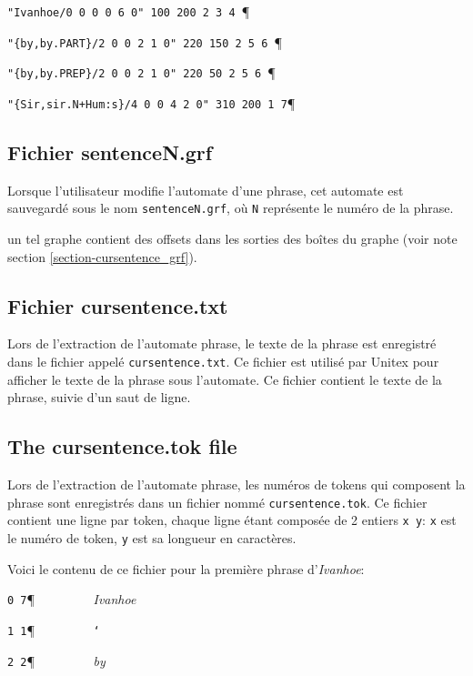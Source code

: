 \bigskip
\noindent \verb$"Ivanhoe/0 0 0 0 6 0" 100 200 2 3 4 $\P
 
\noindent \verb$"{by,by.PART}/2 0 0 2 1 0" 220 150 2 5 6 $\P

\noindent \verb$"{by,by.PREP}/2 0 0 2 1 0" 220 50 2 5 6 $\P

\noindent \verb$"{Sir,sir.N+Hum:s}/4 0 0 4 2 0" 310 200 1 7$\P 




\subsection{Fichier sentenceN.grf}
Lorsque l’utilisateur modifie l’automate d’une phrase, cet automate est sauvegardé sous
le nom \verb+sentenceN.grf+, où \verb+N+ représente le numéro de la phrase.

un tel graphe contient des offsets dans les sorties des boîtes du graphe (voir note 
section \ref{section-cursentence_grf}).


\subsection{Fichier cursentence.txt}
Lors de l'extraction de l'automate phrase, le texte de la phrase est
enregistré dans le fichier appelé \verb+cursentence.txt+. Ce fichier est utilisé par Unitex pour
afficher le texte de la phrase sous l'automate. Ce fichier contient le texte de la phrase, suivie
d'un saut de ligne.

\subsection{The cursentence.tok file}
Lors de l'extraction de l'automate phrase, les numéros de tokens qui composent la phrase sont
enregistrés dans un fichier nommé \verb+cursentence.tok+. Ce fichier contient une ligne par token,
chaque ligne étant composée de 2 entiers \verb$x y$: \verb$x$ est le numéro de token, \verb$y$ est
sa longueur en caractères.

\bigskip
\noindent Voici le contenu de ce fichier pour la première phrase d'\textit{Ivanhoe}:

\bigskip
\noindent \verb$0 7$\P \verb$         $\textit{Ivanhoe}

\noindent \verb$1 1$\P \verb$         $\texttt{\char `\ }

\noindent \verb$2 2$\P \verb$         $\textit{by}

